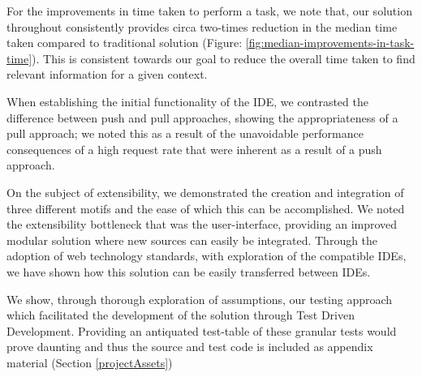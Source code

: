 For the improvements in time taken to perform a task, we note that, our solution throughout consistently provides circa two-times reduction in the median time taken compared to traditional solution (Figure: \ref{fig:median-improvements-in-task-time}). This is consistent towards our goal to reduce the overall time taken to find relevant information for a given context.

When establishing the initial functionality of the IDE, we contrasted the difference between push and pull approaches, showing the appropriateness of a pull approach; we noted this as a result of the unavoidable performance consequences of a high request rate that were inherent as a result of a push approach. 

On the subject of extensibility, we demonstrated the creation and integration of three different motifs and the ease of which this can be accomplished. We noted the extensibility bottleneck that was the user-interface, providing an improved modular solution where new sources can easily be integrated. Through the adoption of web technology standards, with exploration of the compatible IDEs, we have shown how this solution can be easily transferred between IDEs.

We show, through thorough exploration of assumptions, our testing approach which facilitated the development of the solution through Test Driven Development. Providing an antiquated test-table of these granular tests would prove daunting and thus the source and test code is included as appendix material (Section \ref{projectAssets})